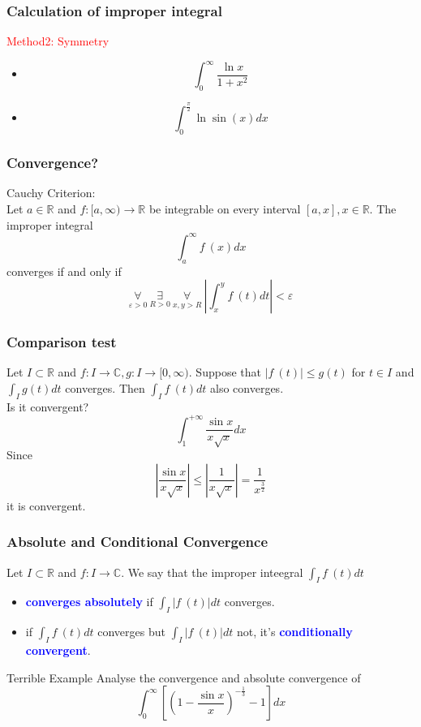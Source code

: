 \documentclass{beamer}
\newcommand{\R}{\mathbb{R}}
\newcommand{\h}{\hspace{1em}}
\newcommand{\vs}{\vspace{1em}}
\begin{document}
\begin{frame}
    \frametitle{Calculation of improper integral}
    \textcolor{red}{Method2: Symmetry}
    \begin{itemize}
        \item $$\int_0^\infty \frac{\ln x}{1+x^2}$$
        \item $$\int_0^\frac{\pi}{2} \ln \sin (x) dx$$
    \end{itemize}
\end{frame}

\begin{frame}
    \frametitle{Convergence?}
    Cauchy Criterion:\\
    \hspace{1em}
    Let $a\in \mathbb{R} $ and $f:[a,\infty) \to \mathbb{R}$ be integrable
    on every interval $[a,x],x \in \R$. The improper integral
    $$\int_a^\infty f~(x ) dx $$
    converges if and only if 
    $$\underset{\varepsilon>0}{\forall}~ \underset{R>0}{\exists} ~\underset{x,y>R}{\forall} ~|\int_x^y f~(t) dt| < \varepsilon$$
\end{frame}
\begin{frame}
    \frametitle{Comparison test}
    \h Let $I \subset \R$ and $f: I \to \mathbb{C}, g: I \to [0,\infty).$
Suppose that      $|f~(t)|\leq g(t)$ for $t \in I $ and $\int_I g(t)dt $ converges.
Then $\int_I f~(t)dt$ also converges.\\
    \vs \h
    Is it convergent?
    $$\int_1^{+\infty} \frac{\sin x}{x\sqrt{x}} dx$$
    \pause
    Since 
    $$|\frac{\sin x}{x\sqrt{x}}|\leq |\frac{1}{x\sqrt{x}}|=\frac{1}{x^{\frac{3}{2}}}$$ 
    it is convergent.
\end{frame}
\begin{frame}
    \frametitle{Absolute and Conditional Convergence}
    \h Let $I \subset \R$ and $f: I \to \mathbb{C}$. We say that the improper inteegral $\int_I f~(t)dt$
    \vs
    \begin{itemize}
        \item \textbf{\textcolor{blue}{converges absolutely}} if $\int_I |f~(t)| dt$ converges.
        \item if $\int_I f~(t) dt$ converges but $\int_I |f~(t)| dt$ not, it's \textbf{\textcolor{blue}{conditionally convergent}}.
    \end{itemize}
    \vs
    \begin{block}{Terrible Example}
        Analyse the convergence and absolute convergence of 
        $$\int_0^\infty [(1-\frac{\sin x}{x})^{-\frac{1}{3}}-1]dx$$
    \end{block}
\end{frame}
\end{document}
